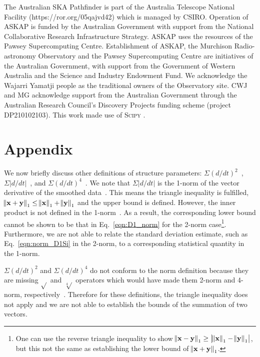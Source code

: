 \documentclass[twocolumn]{aastex631}
\begin{document}
\begin{acknowledgments}
The Australian SKA Pathfinder is part of the Australia Telescope National Facility (https://ror.org/05qajvd42) which is managed by CSIRO. Operation of ASKAP is funded by the Australian Government with support from the National Collaborative Research Infrastructure Strategy. ASKAP uses the resources of the Pawsey Supercomputing Centre. Establishment of ASKAP, the Murchison Radio-astronomy Observatory and the Pawsey Supercomputing Centre are initiatives of the Australian Government, with support from the Government of Western Australia and the Science and Industry Endowment Fund. We acknowledge the Wajarri Yamatji people as the traditional owners of the Observatory site.
CWJ and MG acknowledge support from the Australian Government through the Australian Research Council's Discovery Projects funding scheme (project DP210102103). This work made use of \textsc{Scipy} \citep{SciPy2019}.
\end{acknowledgments}

\section*{Appendix} \label{sec:app}
We now briefly discuss other definitions of structure parameters: $\Sigma \left(d/dt\right)^2$~\citep{Hessels_2019}, $\Sigma \left|d/dt\right|$~\citep{Gajjar_2018}, and $\Sigma \left(d/dt\right)^4$~\citep{Josephy_2019}. We note that $\Sigma \left|d/dt\right|$ is the 1-norm of the vector derivative of the smoothed data~\citep[see Ch.~1]{Strang_LALD2019}. This means the triangle inequality is fulfilled, $\norm{\mathbf{x}+\mathbf{y}}_1\leq\norm{\mathbf{x}}_1+\norm{\mathbf{y}}_1$ and the upper bound is defined. However, the inner product is not defined in the 1-norm~\citep[see. Ch.~1]{Strang_LALD2019}. As a result, the corresponding lower bound cannot be shown to be that in Eq.~\eqref{eqn:D1_norm} for the 2-norm case\footnote{One can use the reverse triangle inequality to show $\norm{\mathbf{x}-\mathbf{y}}_1\geq\left|\norm{\mathbf{x}}_1-\norm{\mathbf{y}}_1\right|$, but this not the same as establishing the lower bound of $\norm{\mathbf{x}+\mathbf{y}}_1$.}. Furthermore, we are not able to relate the standard deviation estimate, such as Eq.~\eqref{eqn:norm_D1Si} in the 2-norm, to a corresponding statistical quantity in the 1-norm.

$\Sigma \left(d/dt\right)^2$ and $\Sigma \left(d/dt\right)^4$ do not conform to the norm definition because they are missing $\sqrt{}$ and $\sqrt[4]{}$ operators which would have made them 2-norm and 4-norm, respectively~\citep[see Ch.~7]{Laub_LA}. Therefore for these definitions, the triangle inequality does not apply and we are not able to establish the bounds of the summation of two vectors.
\end{document}
